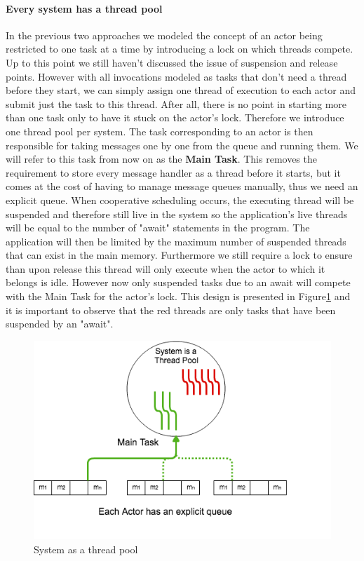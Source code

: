 \paragraph{Every system has a thread pool}
In the previous two approaches we modeled the concept of an actor being restricted to one task at a time by introducing a lock on which threads compete. Up to this point we still haven't discussed the issue of suspension and release points. However with all invocations modeled as tasks that don't need a thread before they start, we can simply assign one thread of execution to each actor and submit just the task to this thread. After all, there is no point in starting more than one task only to have it stuck on the actor's lock. Therefore we introduce one thread pool per system. The task corresponding to an actor is then responsible for taking messages one by one from the queue and running them. We will refer to this task from now on as the \textbf{Main Task}. This removes the requirement to store every message handler as a thread before it starts, but it comes at the cost of having to manage message queues manually, thus we need an explicit queue.
When cooperative scheduling occurs, the executing thread will be suspended and therefore still live in the system so the application's live threads will be equal to the number of "await" statements in the program. The application will then be limited by the maximum number of suspended threads that can exist in the main memory.  Furthermore we still require a lock to ensure than upon release this thread will only execute when the actor to which it belongs is idle. However now only suspended tasks due to an await will compete with the Main Task for the actor's lock. This design is presented in Figure\ref{stp} and it is important to observe that the red threads are only tasks that have been suspended by an "await".


\begin{figure}
	\label{stp}
	\centering
	\includegraphics[scale=0.7]{stp.png}
	\caption{System as a thread pool}
\end{figure}


